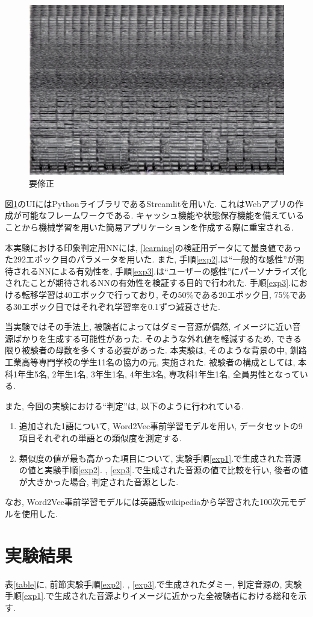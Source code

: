 \documentclass[a4paper,11pt,dvipdfmx]{jreport}
\begin{document}
\begin{figure}[htbp]
  \centering
  \includegraphics[width=0.4\linewidth]{energy_guitar.jpg}
  \caption{要修正}
  \label{UI1}
\end{figure}

図\ref{UI1}のUIにはPythonライブラリであるStreamlit\cite{stream}を用いた.
これはWebアプリの作成が可能なフレームワークである. 
キャッシュ機能や状態保存機能を備えていることから機械学習を用いた簡易アプリケーションを作成する際に重宝される.

本実験における印象判定用NNには, \ref{learning}の検証用データにて最良値であった292エポック目のパラメータを用いた.
また, 手順\ref{exp2}.は``一般的な感性''が期待されるNNによる有効性を, 手順\ref{exp3}.は``ユーザーの感性''にパーソナライズ化されたことが期待されるNNの有効性を検証する目的で行われた.
手順\ref{exp3}.における転移学習は40エポックで行っており, その50\%である20エポック目, 75\%である30エポック目ではそれぞれ学習率を0.1ずつ減衰させた.


当実験ではその手法上, 被験者によってはダミー音源が偶然, イメージに近い音源ばかりを生成する可能性があった.
そのような外れ値を軽減するため, できる限り被験者の母数を多くする必要があった.
本実験は, そのような背景の中, 釧路工業高等専門学校の学生11名の協力の元, 実施された.
被験者の構成としては, 本科1年生5名, 2年生1名, 3年生1名, 4年生3名, 専攻科1年生1名, 全員男性となっている.

また, 今回の実験における``判定''は, 以下のように行われている.
\begin{enumerate}
  \item 追加された1語について, Word2Vec事前学習モデルを用い, 
        データセットの9項目それぞれの単語との類似度を測定する.
  \item 類似度の値が最も高かった項目について, 
        実験手順\ref{exp1}.で生成された音源の値と実験手順\ref{exp2}. , \ref{exp3}.で生成された音源の値で比較を行い, 後者の値が大きかった場合, 
        判定された音源とした.
\end{enumerate}
なお, Word2Vec事前学習モデルには英語版wikipediaから学習された100次元モデル\cite{NLP}を使用した.

\section{実験結果}
表\ref{table}に, 前節実験手順\ref{exp2}. , \ref{exp3}.で生成されたダミー, 判定音源の, 実験手順\ref{exp1}.で生成された音源よりイメージに近かった全被験者における総和を示す.
\end{document}
